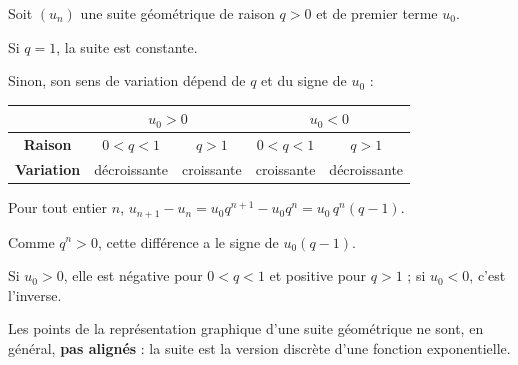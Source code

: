 \documentclass{poly}
\begin{document}
\begin{propriete}
	Soit $(u_n)$ une suite géométrique de raison $q > 0$ et de premier terme $u_0$.

	Si $q = 1$, la suite est constante.

	Sinon, son sens de variation dépend de $q$ et du signe de $u_0$ :
	\begin{center}
		\begin{tabular}{|c|c|c|c|c|} \hline
			\ccg                    & \multicolumn{2}{c|}{\ccg $u_0 > 0$} & \multicolumn{2}{c|}{\ccg $u_0 < 0$}                              \\ \hline
			\ccg \textbf{Raison}    & $0 < q < 1$                         & $q > 1$                             & $0 < q < 1$ & $q > 1$      \\ \hline
			\ccg \textbf{Variation} & décroissante                        & croissante                          & croissante  & décroissante \\ \hline
		\end{tabular}
	\end{center}
\end{propriete}

\begin{demonstration}
	Pour tout entier $n$, $u_{n+1} - u_n = u_0 q^{n+1} - u_0 q^n = u_0 \, q^n (q - 1)$.

	Comme $q^n > 0$, cette différence a le signe de $u_0 (q - 1)$.

	Si $u_0 > 0$, elle est négative pour $0 < q < 1$ et positive pour $q > 1$ ; si $u_0 < 0$, c'est l'inverse.
\end{demonstration}

\begin{representation}
	Les points de la représentation graphique d'une suite géométrique ne sont, en général, \textbf{pas alignés} : la suite est la version discrète d'une fonction exponentielle.
\end{representation}
\end{document}
